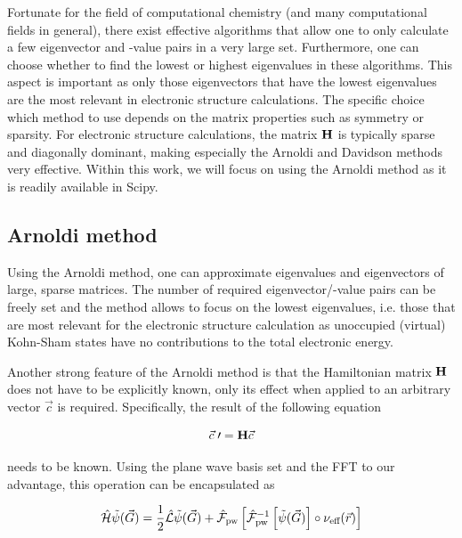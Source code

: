 Fortunate for the field of computational chemistry (and many computational fields in general), there exist effective algorithms that allow one to only calculate a few eigenvector and -value pairs in a very large set. Furthermore, one can choose whether to find the lowest or highest eigenvalues in these algorithms. This aspect is important as only those eigenvectors that have the lowest eigenvalues are the most relevant in electronic structure calculations. The specific choice which method to use depends on the matrix properties such as symmetry or sparsity. For electronic structure calculations, the matrix $\mathbf{H}$ is typically sparse and diagonally dominant, making especially the Arnoldi\cite{1951:arnoldi} and Davidson\cite{1975:davidson} methods very effective. Within this work, we will focus on using the Arnoldi method as it is readily available in Scipy.\cite{arnoldi_scipy}

%
%
%
\subsection{Arnoldi method}

Using the Arnoldi method, one can approximate eigenvalues and eigenvectors of large, sparse matrices. The number of required eigenvector/-value pairs can be freely set and the method allows to focus on the lowest eigenvalues, i.e. those that are most relevant for the electronic structure calculation as unoccupied (virtual) Kohn-Sham states have no contributions to the total electronic energy.

Another strong feature of the Arnoldi method is that the Hamiltonian matrix $\mathbf{H}$ does not have to be explicitly known, only its effect when applied to an arbitrary vector $\vec{c}$ is required. Specifically, the result of the following equation

\begin{equation}
    \vec{c}\;\prime = \mathbf{H}\vec{c}
\end{equation}

needs to be known. Using the plane wave basis set and the FFT to our advantage, this operation can be encapsulated as

\begin{equation}
    \hat{\mathcal{H}}\tilde{\psi}(\vec{G}) = \frac{1}{2} \hat{\mathcal{L}}\tilde{\psi}(\vec{G}) + \hat{\mathcal{F}}_{\text{pw}}\left[\hat{\mathcal{F}}_{\text{pw}}^{-1}\left[\tilde{\psi}(\vec{G}) \right] \circ \nu_{\text{eff}}(\vec{r}) \right]
    \label{eq:appl_hamil}
\end{equation}

